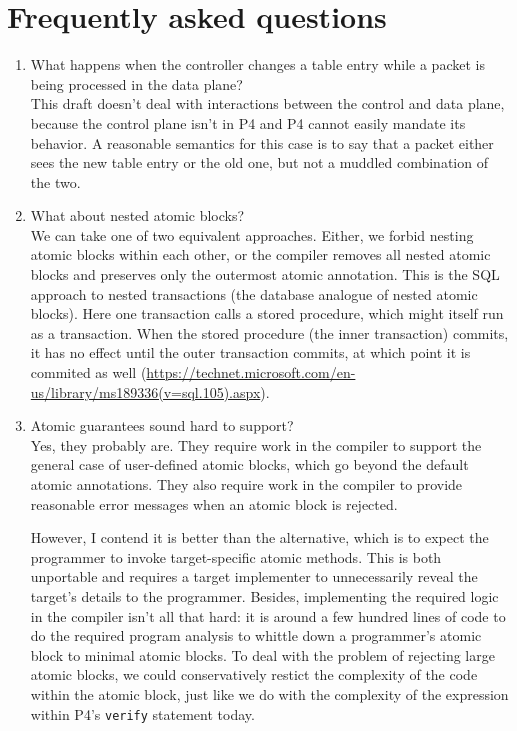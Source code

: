\section{Frequently asked questions}
\label{s:faq}

\begin{enumerate}
\item What happens when the controller changes a table entry while a packet is
being processed in the data plane? \\
This draft doesn't deal with interactions between the control and data plane,
because the control plane isn't in P4 and P4 cannot easily mandate its
behavior. A reasonable semantics for this case is to say that a packet either
sees the new table entry or the old one, but not a muddled combination of the
two.

\item What about nested atomic blocks?\\
We can take one of two equivalent approaches. Either, we forbid nesting atomic
blocks within each other, or the compiler removes all nested atomic blocks and
preserves only the outermost atomic annotation. This is the SQL approach to
nested transactions (the database analogue of nested atomic blocks).  Here one
transaction calls a stored procedure, which might itself run as a transaction.
When the stored procedure (the inner transaction) commits, it has no effect
until the outer transaction commits, at which point it is commited as well
(\url{https://technet.microsoft.com/en-us/library/ms189336(v=sql.105).aspx}).

\item Atomic guarantees sound hard to support?\\
Yes, they probably are. They require work in the compiler to support the
general case of user-defined atomic blocks, which go beyond the default atomic
annotations. They also require work in the compiler to provide reasonable error
messages when an atomic block is rejected.

However, I contend it is better than the alternative, which is to expect the
programmer to invoke target-specific atomic methods. This is both unportable
and requires a target implementer to unnecessarily reveal the target's details
to the programmer. Besides, implementing the required logic in the compiler
isn't all that hard: it is around a few hundred lines of code to do the
required program analysis to whittle down a programmer's atomic block to
minimal atomic blocks. To deal with the problem of rejecting large atomic blocks,
we could conservatively restict the complexity of
the code within the atomic block, just like we do with the complexity of the
expression within P4's \texttt{verify} statement today.


\end{enumerate}
